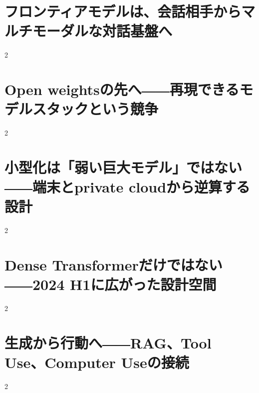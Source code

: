 \documentclass[lualatex,a4paper,11pt]{jlreq}
\begin{document}
\surveycover
\clearpage


\clearpage
\section{フロンティアモデルは、会話相手からマルチモーダルな対話基盤へ}
\label{pkg:frontier-interaction}

\medskip
\begin{multicols}{2}

\end{multicols}


\clearpage
\section{Open weightsの先へ――再現できるモデルスタックという競争}
\label{pkg:open-ecosystem}

\medskip
\begin{multicols}{2}

\end{multicols}


\clearpage
\section{小型化は「弱い巨大モデル」ではない――端末とprivate cloudから逆算する設計}
\label{pkg:edge-private}

\medskip
\begin{multicols}{2}

\end{multicols}


\clearpage
\section{Dense Transformerだけではない――2024 H1に広がった設計空間}
\label{pkg:architecture-efficiency}

\medskip
\begin{multicols}{2}

\end{multicols}


\clearpage
\section{生成から行動へ――RAG、Tool Use、Computer Useの接続}
\label{pkg:action-rag-agents}

\medskip
\begin{multicols}{2}

\end{multicols}

\end{document}
